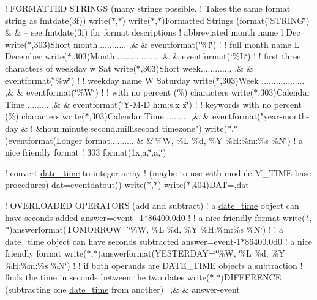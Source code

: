 ! F\+O\+R\+M\+A\+T\+T\+ED S\+T\+R\+I\+N\+GS (many strings possible. ! Takes the same format string as fmtdate(3f)) write($\ast$,$\ast$) write($\ast$,$\ast$)\textquotesingle{}Formatted Strings (format(\char`\"{}\+S\+T\+R\+I\+N\+G\char`\"{}) \& \& -- see fmtdate(3f) for format descriptions\textquotesingle{} ! abbreviated month name l Dec write($\ast$,303)\textquotesingle{}Short month............ \textquotesingle{},\& \& eventformat(\char`\"{}\%l\char`\"{}) ! ! full month name L December write($\ast$,303)\textquotesingle{}Month.................. \textquotesingle{},\& \& eventformat(\char`\"{}\%\+L\char`\"{}) ! ! first three characters of weekday w Sat write($\ast$,303)\textquotesingle{}Short week............. \textquotesingle{},\& \& eventformat(\char`\"{}\%w\char`\"{}) ! ! weekday name W Saturday write($\ast$,303)\textquotesingle{}Week .................. \textquotesingle{},\& \& eventformat(\char`\"{}\%\+W\char`\"{}) ! ! with no percent (\%) characters write($\ast$,303)\textquotesingle{}Calendar Time ......... \textquotesingle{},\& \& eventformat(\char`\"{}\+Y-\/\+M-\/\+D h\+:m\+:s.\+x z\char`\"{}) ! ! keywords with no percent (\%) characters write($\ast$,303)\textquotesingle{}Calendar Time ......... \textquotesingle{},\& \& eventformat(\textquotesingle{}"year-\/month-\/day \& ! \&hour\+:minute\+:second.\+millisecond timezone"\textquotesingle{}) write($\ast$,$\ast$)eventformat(\textquotesingle{}Longer format.......... \& \&\char`\"{}\%\+W, \%\+L \%d, \%\+Y \%\+H\+:\%m\+:\%s \%\+N\char`\"{}\textquotesingle{}) ! a nice friendly format ! 303 format(1x,a,\textquotesingle{}\char`\"{}\textquotesingle{},a,\textquotesingle{}\char`\"{}\textquotesingle{})

! convert \mbox{\hyperlink{structm__time__oop_1_1date__time}{date\+\_\+time}} to integer array ! (maybe to use with module M\+\_\+\+T\+I\+ME base procedures) dat=eventdatout() write($\ast$,$\ast$) write($\ast$,404)\textquotesingle{}D\+AT=\textquotesingle{},dat

! O\+V\+E\+R\+L\+O\+A\+D\+ED O\+P\+E\+R\+A\+T\+O\+RS (add and subtract) ! a \mbox{\hyperlink{structm__time__oop_1_1date__time}{date\+\_\+time}} object can have seconds added answer=event+1$\ast$86400.0d0 ! ! a nice friendly format write($\ast$,$\ast$)answerformat(\textquotesingle{}T\+O\+M\+O\+R\+R\+OW=\char`\"{}\%\+W, \%\+L \%d, \%\+Y \%\+H\+:\%m\+:\%s \%\+N\char`\"{}\textquotesingle{}) ! ! a \mbox{\hyperlink{structm__time__oop_1_1date__time}{date\+\_\+time}} object can have seconds subtracted answer=event-\/1$\ast$86400.0d0 ! a nice friendly format write($\ast$,$\ast$)answerformat(\textquotesingle{}Y\+E\+S\+T\+E\+R\+D\+AY=\char`\"{}\%\+W, \%\+L \%d, \%\+Y \%\+H\+:\%m\+:\%s \%\+N\char`\"{}\textquotesingle{}) ! ! if both operands are D\+A\+T\+E\+\_\+\+T\+I\+ME objects a subtraction ! finds the time in seconds between the two dates write($\ast$,$\ast$)\textquotesingle{}D\+I\+F\+F\+E\+R\+E\+N\+CE (subtracting one \mbox{\hyperlink{structm__time__oop_1_1date__time}{date\+\_\+time}} from another)=\textquotesingle{},\& \& answer-\/event

